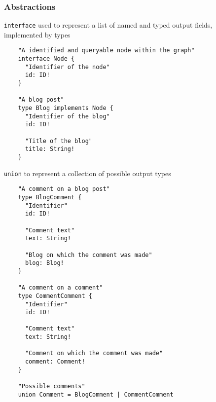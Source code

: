 \documentclass[notes]{beamer}
\begin{document}
\begin{frame}[fragile]
  \frametitle{Abstractions}
  \texttt{interface} used to represent a list of named and typed output fields, implemented by types
  \begin{verbatim}
    "A identified and queryable node within the graph"
    interface Node {
      "Identifier of the node"
      id: ID!
    }

    "A blog post"
    type Blog implements Node {
      "Identifier of the blog"
      id: ID!

      "Title of the blog"
      title: String!
    }
  \end{verbatim}

  \texttt{union} to represent a collection of possible output types
  \begin{verbatim}
    "A comment on a blog post"
    type BlogComment {
      "Identifier"
      id: ID!

      "Comment text"
      text: String!

      "Blog on which the comment was made"
      blog: Blog!
    }

    "A comment on a comment"
    type CommentComment {
      "Identifier"
      id: ID!

      "Comment text"
      text: String!

      "Comment on which the comment was made"
      comment: Comment!
    }

    "Possible comments"
    union Comment = BlogComment | CommentComment
  \end{verbatim}
\end{frame}
\end{document}
